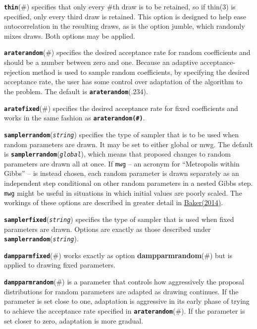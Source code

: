 \documentclass[11pt]{article}
\begin{document}
\textbf{\texttt{thin}}(\#) specifies that only every \#th draw is to be
retained, so if thin(3) is specified, only every third draw is retained.
This option is designed to help ease autocorrelation in the resulting
draws, as is the option jumble, which randomly mixes draws. Both options
may be applied.

\textbf{\texttt{araterandom}}(\#) specifies the desired acceptance rate
for random coefficients and should be a number between zero and one.
Because an adaptive acceptance-rejection method is used to sample random
coefficients, by specifying the desired acceptance rate, the user has
some control over adaptation of the algorithm to the problem. The
default is \textbf{\texttt{araterandom}}(.234).

\textbf{\texttt{aratefixed}}(\#) specifies the desired acceptance rate
for fixed coefficients and works in the same fashion as
\textbf{\texttt{araterandom(\#)}}.

\textbf{\texttt{samplerrandom}}(\emph{\texttt{string}}) specifies the
type of sampler that is to be used when random parameters are drawn. It
may be set to either global or mwg. The default is
\textbf{\texttt{samplerrandom}}(\emph{\texttt{global}}), which means
that proposed changes to random parameters are drawn all at once. If
\texttt{mwg} -- an acronym for ``Metropolis within Gibbs'' -- is instead
chosen, each random parameter is drawn separately as an independent step
conditional on other random parameters in a nested Gibbs step.
\texttt{mwg} might be useful in situations in which initial values are
poorly scaled. The workings of these options are described in greater
detail in
\href{https://www.stata-journal.com/article.html?article=st0354}{Baker(2014)}.

\textbf{\texttt{samplerfixed}}(\emph{\texttt{string}}) specifies the
type of sampler that is used when fixed parameters are drawn. Options
are exactly as those described under
\textbf{\texttt{samplerrandom}}(\emph{\texttt{string}}).

\textbf{\texttt{dampparmfixed}}(\#) works exactly as option
\textbf{dampparmrandom}(\#) but is applied to drawing fixed parameters.

\textbf{\texttt{dampparmrandom}}(\#) is a parameter that controls how
aggressively the proposal distributions for random parameters are
adapted as drawing continues. If the parameter is set close to one,
adaptation is aggressive in its early phase of trying to achieve the
acceptance rate specified in \textbf{\texttt{araterandom}}(\#). If the
parameter is set closer to zero, adaptation is more gradual.
\end{document}
